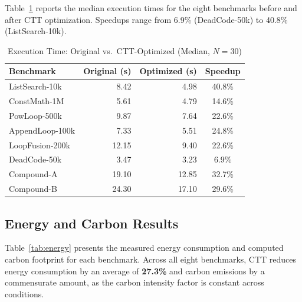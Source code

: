 \documentclass[conference]{IEEEtran}
\begin{document}
Table~\ref{tab:time} reports the median execution times for the eight
benchmarks before and after CTT optimization.  Speedups range from 6.9\%
(DeadCode-50k) to 40.8\% (ListSearch-10k).

\begin{table}[h]
\centering
\caption{Execution Time: Original vs.\ CTT-Optimized (Median, $N=30$)}
\label{tab:time}
\renewcommand{\arraystretch}{1.2}
\begin{tabular}{@{}lrrc@{}}
\toprule
\textbf{Benchmark} & \textbf{Original (s)} & \textbf{Optimized (s)} & \textbf{Speedup} \\
\midrule
ListSearch-10k   & 8.42  & 4.98  & 40.8\% \\
ConstMath-1M     & 5.61  & 4.79  & 14.6\% \\
PowLoop-500k     & 9.87  & 7.64  & 22.6\% \\
AppendLoop-100k  & 7.33  & 5.51  & 24.8\% \\
LoopFusion-200k  & 12.15 & 9.40  & 22.6\% \\
DeadCode-50k     & 3.47  & 3.23  & 6.9\%  \\
Compound-A       & 19.10 & 12.85 & 32.7\% \\
Compound-B       & 24.30 & 17.10 & 29.6\% \\
\bottomrule
\end{tabular}
\end{table}

\subsection{Energy and Carbon Results}

Table~\ref{tab:energy} presents the measured energy consumption and computed
carbon footprint for each benchmark.  Across all eight benchmarks, CTT
reduces energy consumption by an average of \textbf{27.3\%} and carbon
emissions by a commensurate amount, as the carbon intensity factor is constant
across conditions.
\end{document}
